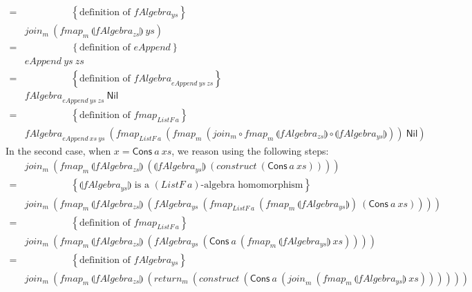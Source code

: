 \documentclass{jfp1}
\newcommand{\fold}[1]{\llparenthesis #1 \rrparenthesis}
\newcommand{\eqAnnotation}[1]{\hspace{2cm}\left\{\textrm{#1}\right\}}
\begin{document}
\begin{proof*}
\begin{displaymath}
\begin{array}{cl}
      =&\eqAnnotation{definition of $\mathit{fAlgebra_{ys}}$} \\
      &\mathit{join_m}~(\mathit{fmap_m}~\fold{\mathit{fAlgebra_{zs}}}~\mathit{ys}) \\
      =&\eqAnnotation{definition of $\mathit{eAppend}$} \\
      &\mathit{eAppend}~\mathit{ys}~\mathit{zs} \\
      =&\eqAnnotation{definition of $\mathit{fAlgebra}_{\mathit{eAppend}~\mathit{ys}~\mathit{zs}}$} \\
      &\mathit{fAlgebra}_{\mathit{eAppend}~\mathit{ys}~\mathit{zs}}~\mathsf{Nil} \\
      =&\eqAnnotation{definition of $\mathit{fmap}_{\mathit{ListF}~a}$} \\
      &\mathit{fAlgebra}_{\mathit{eAppend}~\mathit{xs}~\mathit{ys}}~(\mathit{fmap}_{\mathit{ListF}~a}~(\mathit{fmap}_m~(\mathit{join_m} \circ \mathit{fmap}_m~\fold{\mathit{fAlgebra_{zs}}} \circ \fold{\mathit{fAlgebra_{ys}}}))~\mathsf{Nil})
    \end{array}
  \end{displaymath}
  In the second case, when $x = \mathsf{Cons}~a~\mathit{xs}$, we
  reason using the following steps:
  \begin{displaymath}
    \begin{array}{cl}
      &\mathit{join_m}~(\mathit{fmap}_m~\fold{\mathit{fAlgebra_{zs}}}~(\fold{\mathit{fAlgebra_{ys}}}~(\mathit{construct}~(\mathsf{Cons}~a~\mathit{xs})))) \\
      =&\eqAnnotation{$\fold{\mathit{fAlgebra_{ys}}}$ is a $(\mathit{ListF}~a)$-algebra homomorphism} \\
      &\mathit{join_m}~(\mathit{fmap}_m~\fold{\mathit{fAlgebra_{zs}}}~(\mathit{fAlgebra_{ys}}~(\mathit{fmap}_{\mathit{ListF}~a}~(\mathit{fmap}_m~\fold{\mathit{fAlgebra_{ys}}})~(\mathsf{Cons}~a~\mathit{xs})))) \\
      =&\eqAnnotation{definition of $\mathit{fmap_{\mathit{ListF}~a}}$} \\
      &\mathit{join_m}~(\mathit{fmap}_m~\fold{\mathit{fAlgebra_{zs}}}~(\mathit{fAlgebra_{ys}}~(\mathsf{Cons}~a~(\mathit{fmap}_m~\fold{\mathit{fAlgebra_{ys}}}~\mathit{xs})))) \\
      =&\eqAnnotation{definition of $\mathit{fAlgebra_{ys}}$} \\
      &\mathit{join_m}~(\mathit{fmap}_m~\fold{\mathit{fAlgebra_{zs}}}~(\mathit{return}_m~(\mathit{construct}~(\mathsf{Cons}~a~(\mathit{join}_m~(\mathit{fmap_m}~\fold{\mathit{fAlgebra_{ys}}}~\mathit{xs})))))) \\

\end{array}
\end{displaymath}
\end{proof*}
\end{document}
